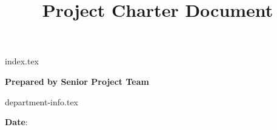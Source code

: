 \title{Project Charter Document}
\author{\TeamName}
\date{\DocumentDate}


\makeatletter
    \renewcommand{\maketitle}
    {%
        \vspace{\stretch{1}}
        \begin{center}
            {index.tex}%
            \begin{center}
                \setlength{\parskip}{2.0\baselineskip}
                \setlength{\parindent}{0pt}
                \vspace{\stretch{1}}
                \Large%
                \ClientName

                {\bfseries \MakeUppercase{\@title}}

                \textbf{Prepared by Senior Project Team} \\
                \@author

                {department-info.tex}

                \textbf{Date}: \@date
                \vspace{\stretch{1}}
            \end{center}
        \end{center}
    }

\makeatother
%
%
\maketitle

\thispagestyle{empty}